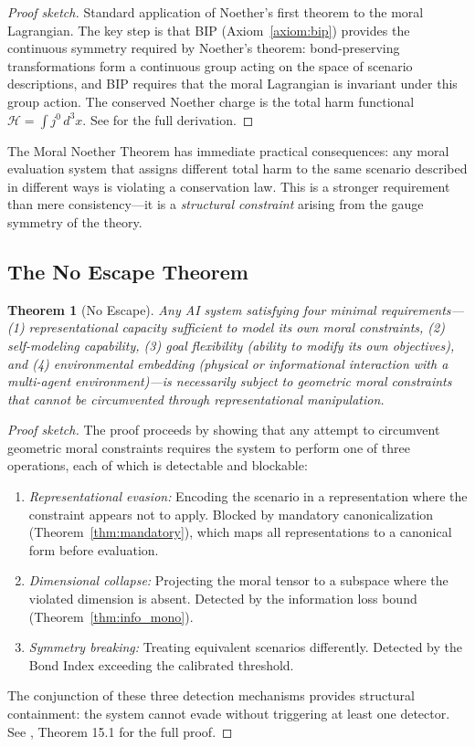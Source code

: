 \documentclass[12pt]{article}
\newtheorem{theorem}{Theorem}[section]
\theoremstyle{definition}
\theoremstyle{remark}
\newcommand{\harm}{\mathcal{H}}
\begin{document}
\begin{proof}[Proof sketch]
Standard application of Noether's first theorem to the moral Lagrangian. The key step is that BIP (Axiom~\ref{axiom:bip}) provides the continuous symmetry required by Noether's theorem: bond-preserving transformations form a continuous group acting on the space of scenario descriptions, and BIP requires that the moral Lagrangian is invariant under this group action. The conserved Noether charge is the total harm functional $\harm = \int j^0\, d^3x$. See \citet{anon2025b} for the full derivation.
\end{proof}

The Moral Noether Theorem has immediate practical consequences: any moral evaluation system that assigns different total harm to the same scenario described in different ways is violating a conservation law. This is a stronger requirement than mere consistency---it is a \emph{structural constraint} arising from the gauge symmetry of the theory.

\subsection{The No Escape Theorem}

\begin{theorem}[No Escape]
\label{thm:no_escape}
Any AI system satisfying four minimal requirements---(1) representational capacity sufficient to model its own moral constraints, (2) self-modeling capability, (3) goal flexibility (ability to modify its own objectives), and (4) environmental embedding (physical or informational interaction with a multi-agent environment)---is necessarily subject to geometric moral constraints that cannot be circumvented through representational manipulation.
\end{theorem}

\begin{proof}[Proof sketch]
The proof proceeds by showing that any attempt to circumvent geometric moral constraints requires the system to perform one of three operations, each of which is detectable and blockable:
\begin{enumerate}
    \item \emph{Representational evasion:} Encoding the scenario in a representation where the constraint appears not to apply. Blocked by mandatory canonicalization (Theorem~\ref{thm:mandatory}), which maps all representations to a canonical form before evaluation.
    \item \emph{Dimensional collapse:} Projecting the moral tensor to a subspace where the violated dimension is absent. Detected by the information loss bound (Theorem~\ref{thm:info_mono}).
    \item \emph{Symmetry breaking:} Treating equivalent scenarios differently. Detected by the Bond Index exceeding the calibrated threshold.
\end{enumerate}
The conjunction of these three detection mechanisms provides structural containment: the system cannot evade without triggering at least one detector. See \citet{anon2026a}, Theorem 15.1 for the full proof.
\end{proof}
\end{document}
